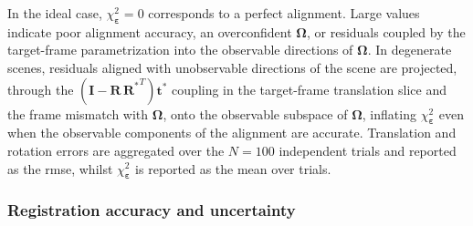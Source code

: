 In the ideal case, $\chi_{\boldsymbol{\varepsilon}}^2 = 0$ corresponds to
a perfect alignment. Large values indicate poor alignment accuracy,
an overconfident $\boldsymbol{\Omega}$, or residuals coupled by the
target-frame parametrization into the observable directions of
$\boldsymbol{\Omega}$. In degenerate scenes, residuals aligned with
unobservable directions of the scene are projected, through the
$(\mathbf{I}-\mathbf{R}\,{\mathbf{R}^*}^T)\mathbf{t}^*$ coupling in the
target-frame translation slice and the frame mismatch with
$\boldsymbol{\Omega}$, onto the observable subspace of
$\boldsymbol{\Omega}$, inflating $\chi^2_{\boldsymbol{\varepsilon}}$ even
when the observable components of the alignment are accurate.
Translation and rotation errors are aggregated over the $N=100$
independent trials and reported as the \gls{rmse}, whilst
$\chi_{\boldsymbol{\varepsilon}}^2$ is reported as the mean over trials.

\subsubsection{Registration accuracy and uncertainty}
\label{sec:distance-maps:results:synthetic:registration}

